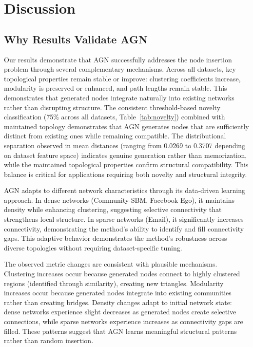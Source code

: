\documentclass[12pt]{article}
\begin{document}
\section{Discussion}

\subsection{Why Results Validate AGN}

Our results demonstrate that AGN successfully addresses the node insertion problem through several complementary mechanisms. Across all datasets, key topological properties remain stable or improve: clustering coefficients increase, modularity is preserved or enhanced, and path lengths remain stable. This demonstrates that generated nodes integrate naturally into existing networks rather than disrupting structure. The consistent threshold-based novelty classification (75\% across all datasets, Table~\ref{tab:novelty}) combined with maintained topology demonstrates that AGN generates nodes that are sufficiently distinct from existing ones while remaining compatible. The distributional separation observed in mean distances (ranging from 0.0269 to 0.3707 depending on dataset feature space) indicates genuine generation rather than memorization, while the maintained topological properties confirm structural compatibility. This balance is critical for applications requiring both novelty and structural integrity.

AGN adapts to different network characteristics through its data-driven learning approach. In dense networks (Community-SBM, Facebook Ego), it maintains density while enhancing clustering, suggesting selective connectivity that strengthens local structure. In sparse networks (Email), it significantly increases connectivity, demonstrating the method's ability to identify and fill connectivity gaps. This adaptive behavior demonstrates the method's robustness across diverse topologies without requiring dataset-specific tuning.

The observed metric changes are consistent with plausible mechanisms. Clustering increases occur because generated nodes connect to highly clustered regions (identified through similarity), creating new triangles. Modularity increases occur because generated nodes integrate into existing communities rather than creating bridges. Density changes adapt to initial network state: dense networks experience slight decreases as generated nodes create selective connections, while sparse networks experience increases as connectivity gaps are filled. These patterns suggest that AGN learns meaningful structural patterns rather than random insertion.
\end{document}
